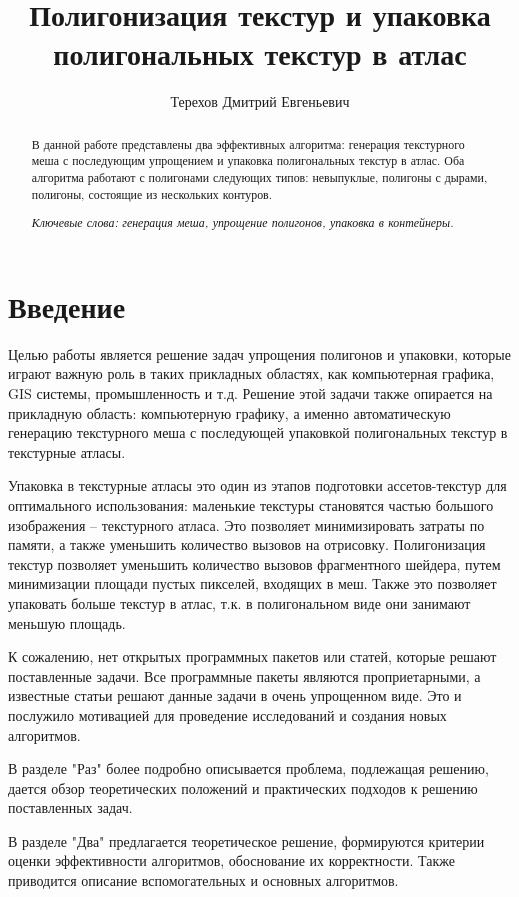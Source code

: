 \documentclass{fefu_thesis/cls/fefu}
\author{Терехов Дмитрий Евгеньевич}
\title{Полигонизация текстур и упаковка полигональных текстур в атлас}
\begin{document}
    \begin{abstract}
        В данной работе представлены два эффективных алгоритма: генерация текстурного меша с последующим упрощением и упаковка полигональных текстур в атлас. Оба алгоритма работают с полигонами следующих типов: невыпуклые, полигоны с дырами, полигоны, состоящие из нескольких контуров.

        \textit{Ключевые слова: генерация меша, упрощение полигонов, упаковка в контейнеры.}
    \end{abstract}
    \pagebreak
    \tableofcontents
    \pagebreak
    {\centering\section*{Введение}}
    Целью работы является решение задач упрощения полигонов и упаковки, которые играют важную роль в таких прикладных областях, как компьютерная графика, GIS системы, промышленность и т.д. Решение этой задачи также опирается на прикладную область: компьютерную графику, а именно автоматическую генерацию текстурного меша с последующей упаковкой полигональных текстур в текстурные атласы.

    Упаковка в текстурные атласы это один из этапов подготовки ассетов-текстур для оптимального использования: маленькие текстуры становятся частью большого изображения -- текстурного атласа. Это позволяет минимизировать затраты по памяти, а также уменьшить количество вызовов на отрисовку. Полигонизация текстур позволяет уменьшить количество вызовов фрагментного шейдера, путем минимизации площади пустых пикселей, входящих в меш. Также это позволяет упаковать больше текстур в атлас, т.к. в полигональном виде они занимают меньшую площадь.

    К сожалению, нет открытых программных пакетов или статей, которые решают поставленные задачи. Все программные пакеты являются проприетарными, а известные статьи решают данные задачи в очень упрощенном виде. Это и послужило мотивацией для проведение исследований и создания новых алгоритмов.

    В разделе "Раз" более подробно описывается проблема, подлежащая решению, дается обзор теоретических положений и практических подходов к решению поставленных задач.

    В разделе "Два" предлагается теоретическое решение, формируются критерии оценки эффективности алгоритмов, обоснование их корректности. Также приводится описание вспомогательных и основных алгоритмов.
\end{document}
